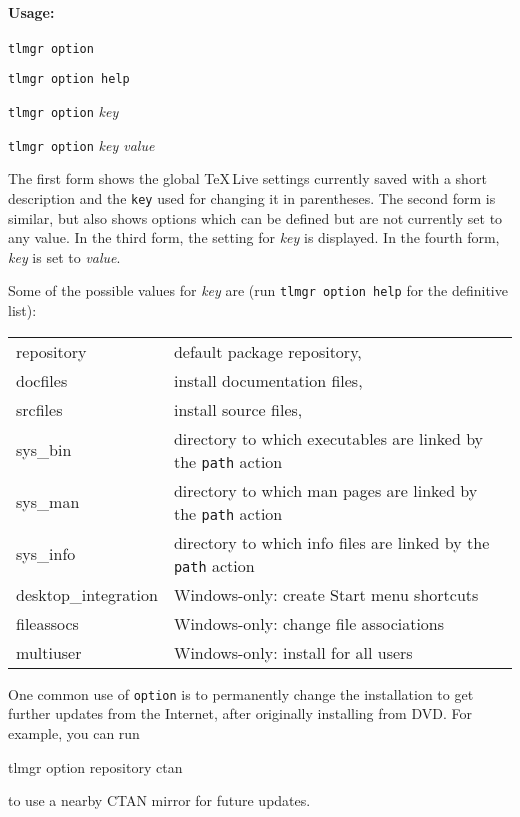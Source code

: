 \documentclass[11pt]{article}
\renewcommand{\ttfamily}{\fontencoding{OT1}\fontfamily{cmtt}\selectfont}
\begin{document}
\paragraph{Usage:}

\begin{list}{}{}
\item \texttt{tlmgr option} 
\item \texttt{tlmgr option help} 
\item \texttt{tlmgr option} \textsl{key}
\item \texttt{tlmgr option} \textsl{key value}
\end{list}

The first form shows the global \TeX\,Live settings currently
saved with a short description and the \texttt{key}
used for changing it in parentheses. The second form is
similar, but also shows options which can be defined but
are not currently set to any value. In the third form, the
setting for \textsl{key} is displayed. In the fourth form,
\textsl{key} is set to \textsl{value}.

Some of the possible values for \textsl{key} are (run \texttt{tlmgr
option help} for the definitive list):

\begin{center}
\begin{small}
\begin{tabular}{@{\ttfamily}ll}
    repository &default package repository,\\
    docfiles & install documentation files,\\
    srcfiles & install source files,\\
    sys\_bin &  directory to which executables are linked by the \texttt{path} action\\
    sys\_man &  directory to which man pages are linked by the \texttt{path} action\\
    sys\_info&  directory to which info files are linked by the \texttt{path} action\\
    desktop\_integration & Windows-only: create Start menu shortcuts\\
    fileassocs& Windows-only: change file associations\\
    multiuser &Windows-only: install for all users\\
\end{tabular}
\end{small}
\end{center}

\noindent
One common use of \texttt{option} is to permanently change
the installation to get further updates from the Internet,
after originally installing from DVD\@. For example, you can
run
\begin{center}\ttfamily
   tlmgr option repository ctan
\end{center}
to use a nearby CTAN mirror for future updates.
\end{document}
